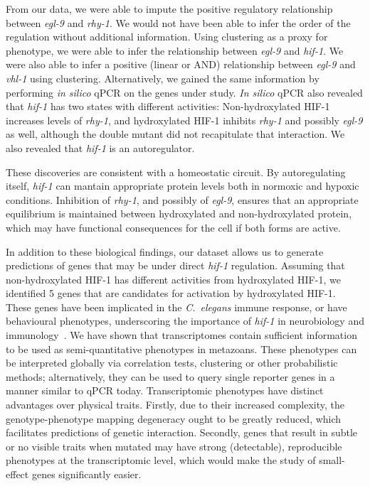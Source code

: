 \documentclass[9pt,twocolumn,twoside]{pnas-new}
\newcommand{\cel}{\emph{C.~elegans}}
\newcommand{\egl}{\emph{egl-9}}
\newcommand{\rhy}{\emph{rhy-1}}
\newcommand{\vhl}{\emph{vhl-1}}
\newcommand{\hif}{\emph{hif-1}}
\newcommand{\hifp}{HIF-1}
\begin{document}
From our data, we were able to impute the positive regulatory relationship between \egl{} and \rhy{}. We would not have been able to infer the order of the regulation without additional information. Using clustering as a proxy for phenotype, we were able to infer the relationship between \egl{} and \hif{}. We were also able to infer a positive (linear or AND) relationship between \egl{} and \vhl{} using clustering. Alternatively, we gained the same information by performing \emph{in silico} qPCR on the genes under study. \emph{In silico} qPCR also revealed that \hif{} has two states with different activities: Non-hydroxylated \hifp{} increases levels of \rhy{}, and hydroxylated \hifp{} inhibits \rhy{} and possibly \egl{} as well, although the double mutant did not recapitulate that interaction. We also revealed that \hif{} is an autoregulator.

These discoveries are consistent with a homeostatic circuit. By autoregulating itself, \hif{} can mantain appropriate protein levels both in normoxic and hypoxic conditions. Inhibition of \rhy{}, and possibly of \egl{}, ensures that an appropriate equilibrium is maintained between hydroxylated and non-hydroxylated protein, which may have functional consequences for the cell if both forms are active.

In addition to these biological findings, our dataset allows us to generate predictions of genes that may be under direct \hif{} regulation. Assuming that non-hydroxylated \hifp{} has different activities from hydroxylated \hifp{}, we identified 5 genes that are candidates for activation by hydroxylated \hifp{}. These genes have been implicated in the \cel{} immune response, or have behavioural phenotypes, underscoring the importance of \hif{} in neurobiology and immunology~\cite{Gray2004,Cheung2005,Chang2008,Ma2013}.
We have shown that transcriptomes contain sufficient information to be used as semi-quantitative phenotypes in metazoans. These phenotypes can be interpreted globally via correlation tests, clustering or other probabilistic methods; alternatively, they can be used to query single reporter genes in a manner similar to qPCR today. Transcriptomic phenotypes have distinct advantages over physical traits.
Firstly, due to their increased complexity, the genotype-phenotype mapping degeneracy ought to be greatly reduced, which facilitates predictions of genetic interaction. Secondly, genes that result in subtle or no visible traits when mutated may have strong (detectable), reproducible phenotypes at the transcriptomic level, which would make the study of small-effect genes significantly easier.
\end{document}
